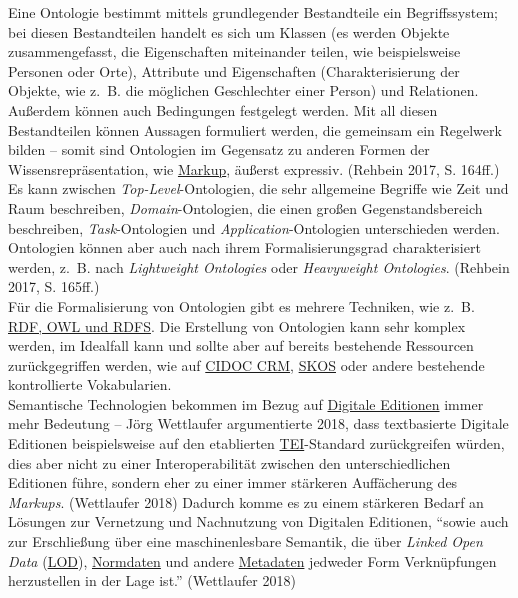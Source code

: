 \documentclass{article}
\begin{document}
        Eine Ontologie bestimmt mittels grundlegender Bestandteile ein Begriffssystem; bei diesen Bestandteilen handelt es sich um Klassen (es werden Objekte zusammengefasst, die Eigenschaften miteinander teilen, wie beispielsweise Personen oder Orte), Attribute und Eigenschaften (Charakterisierung der Objekte, wie z. B. die möglichen Geschlechter einer Person) und Relationen. Außerdem können auch Bedingungen festgelegt werden. Mit all diesen Bestandteilen können Aussagen formuliert werden, die gemeinsam ein Regelwerk bilden – somit sind Ontologien im Gegensatz zu anderen Formen der Wissensrepräsentation, wie \href{http://gams.uni-graz.at/o:konde.126}{Markup}, äußerst expressiv. (Rehbein 2017, S. 164ff.)\\
            
        Es kann zwischen \emph{Top-Level}-Ontologien, die sehr allgemeine Begriffe wie Zeit und Raum beschreiben, \emph{Domain}-Ontologien, die einen großen Gegenstandsbereich beschreiben, \emph{Task}-Ontologien und \emph{Application}-Ontologien unterschieden werden. Ontologien können aber auch nach ihrem Formalisierungsgrad charakterisiert werden, z. B. nach \emph{Lightweight Ontologies} oder \emph{Heavyweight Ontologies}. (Rehbein 2017, S. 165ff.)\\
            
        Für die Formalisierung von Ontologien gibt es mehrere Techniken, wie z. B. \href{http://gams.uni-graz.at/o:konde.131}{RDF, OWL und RDFS}. Die Erstellung von Ontologien kann sehr komplex werden, im Idealfall kann und sollte aber auf bereits bestehende Ressourcen zurückgegriffen werden, wie auf \href{http://gams.uni-graz.at/o:konde.133}{CIDOC CRM}, \href{http://gams.uni-graz.at/o:konde.132}{SKOS} oder andere bestehende kontrollierte Vokabularien.\\
            
        Semantische Technologien bekommen im Bezug auf \href{http://gams.uni-graz.at/o:konde.59}{Digitale Editionen} immer mehr Bedeutung – Jörg Wettlaufer argumentierte 2018, dass textbasierte Digitale Editionen beispielsweise auf den etablierten \href{http://gams.uni-graz.at/o:konde.178}{TEI}-Standard zurückgreifen würden, dies aber nicht zu einer Interoperabilität zwischen den unterschiedlichen Editionen führe, sondern eher zu einer immer stärkeren Auffächerung des \emph{Markups}. (Wettlaufer 2018) Dadurch komme es zu einem stärkeren Bedarf an Lösungen zur Vernetzung und Nachnutzung von Digitalen Editionen, “sowie auch zur Erschließung über eine maschinenlesbare Semantik, die über \emph{Linked Open Data }(\href{http://gams.uni-graz.at/o:konde.8}{LOD}), \href{http://gams.uni-graz.at/o:konde.147}{Normdaten} und andere \href{http://gams.uni-graz.at/o:konde.25}{Metadaten} jedweder Form Verknüpfungen herzustellen in der Lage ist.” (Wettlaufer 2018)\\
            
\end{document}
